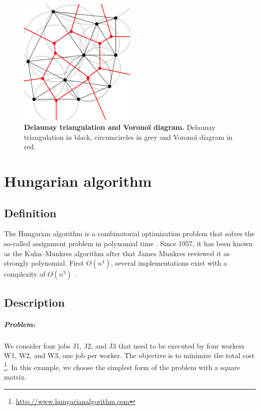 \begin{appendices}
        \begin{figure}[h!]
        \centering
        \includegraphics[width=0.5\textwidth]{part_1/assets/Appendix_delaunay.png}
        \caption{{\bf Delaunay triangulation and Voronoï diagram.} Delaunay triangulation in black, circumcircles in grey and Voronoï diagram in red.}
        \end{figure}

    \chapter{Hungarian algorithm}
        \label{appendix_hungarian}

        \section{Definition}
        The Hungarian algorithm is a combinatorial optimization problem that solves the so-called assignment problem in polynomial time \cite{kuhn1955hungarian}. Since 1957, it has been known as the Kuhn–Munkres algorithm \cite{munkres1957algorithms} after that James Munkres reviewed it as strongly polynomial. First $O(n^{4})$, several implementations exist with a complexity of $O(n^{3})$ \cite{edmonds1972theoretical,tomizawa1971some,jonker1987shortest}.

        \section{Description}
        \paragraph{Problem:} We consider four jobs J1, J2, and J3 that need to be executed by four workers W1, W2, and W3, one job per worker. The objective is to minimize the total cost \footnote{\url{http://www.hungarianalgorithm.com}}. In this example, we choose the simplest form of the problem with a square matrix.


\end{appendices}
